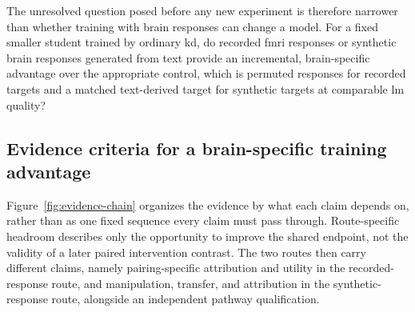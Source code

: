 The unresolved question posed before any new experiment is therefore narrower than whether training with brain responses can change a model.
For a fixed smaller student trained by ordinary \ac{kd}, do recorded \ac{fmri} responses or synthetic brain responses generated from text provide an incremental, brain-specific advantage over the appropriate control, which is permuted responses for recorded targets and a matched text-derived target for synthetic targets at comparable \ac{lm} quality?

\subsection{Evidence criteria for a brain-specific training advantage}
\label{sec:evidence-criteria}

Figure~\ref{fig:evidence-chain} organizes the evidence by what each claim depends on, rather than as one fixed sequence every claim must pass through.
Route-specific headroom describes only the opportunity to improve the shared endpoint, not the validity of a later paired intervention contrast.
 The two routes then carry different claims, namely pairing-specific attribution and utility in the recorded-response route, and manipulation, transfer, and attribution in the synthetic-response route, alongside an independent pathway qualification.

